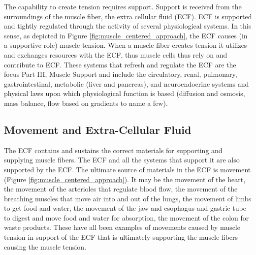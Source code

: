 The capability to create tension requires support. Support is received from the surroundings of the muscle fiber, the extra cellular fluid (ECF). ECF is supported and tightly regulated through the activity of several physiological systems. In this sense, as depicted in Figure \ref{fig:muscle_centered_approach}, the ECF causes (in a supportive role) muscle tension.\footnotemark{} When a muscle fiber creates tension it utilizes and exchanges resources with the ECF, thus muscle cells thus rely on and contribute to ECF. These systems that refresh and regulate the ECF are the focus Part III, Muscle Support and include the circulatory, renal, pulmonary, gastrointestinal, metabolic (liver and pancreas), and neuroendocrine systems and physical laws upon which physiological function is based (diffusion and osmosis, mass balance, flow based on gradients to name a few).

\subsection{Movement and Extra-Cellular Fluid}

The ECF contains and sustains the correct materials for supporting and supplying muscle fibers. The ECF and all the systems that support it are also supported by the ECF. The ultimate source of materials in the ECF is movement (Figure \ref{fig:muscle_centered_approach}). It may be the movement of the heart, the movement of the arterioles that regulate blood flow, the movement of the breathing muscles that move air into and out of the lungs, the movement of limbs to get food and water, the movement of the jaw and esophagus and gastric tube to digest and move food and water for absorption, the movement of the colon for waste products. These have all been examples of movements caused by muscle tension in support of the ECF that is ultimately supporting the muscle fibers causing the muscle tension.


